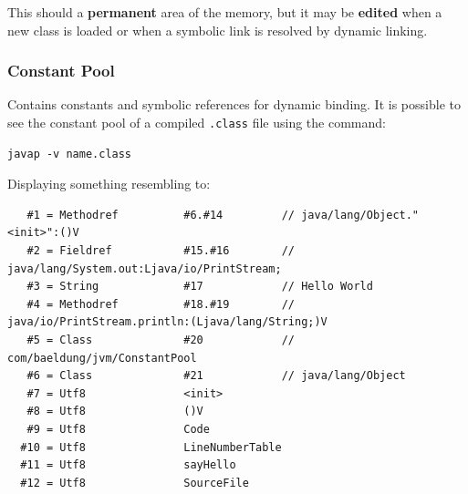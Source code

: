 
This should a \textbf{permanent} area of the memory, but it may be \textbf{edited} when a new class is loaded or when a symbolic link is resolved by dynamic linking.


\subsubsection{Constant Pool}
Contains constants and symbolic references for dynamic binding.
It is possible to see the constant pool of a compiled \lstinline{.class} file using the command:
\begin{lstlisting}
javap -v name.class
\end{lstlisting}
Displaying something resembling to:
\begin{lstlisting}
   #1 = Methodref          #6.#14         // java/lang/Object."<init>":()V
   #2 = Fieldref           #15.#16        // java/lang/System.out:Ljava/io/PrintStream;
   #3 = String             #17            // Hello World
   #4 = Methodref          #18.#19        // java/io/PrintStream.println:(Ljava/lang/String;)V
   #5 = Class              #20            // com/baeldung/jvm/ConstantPool
   #6 = Class              #21            // java/lang/Object
   #7 = Utf8               <init>
   #8 = Utf8               ()V
   #9 = Utf8               Code
  #10 = Utf8               LineNumberTable
  #11 = Utf8               sayHello
  #12 = Utf8               SourceFile
\end{lstlisting}

